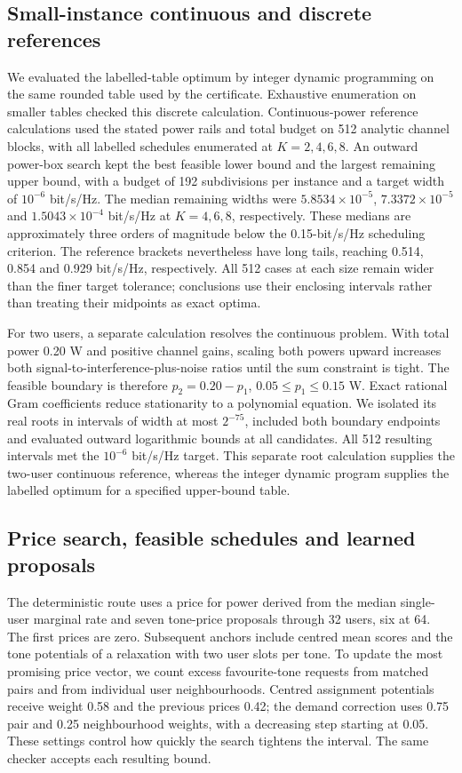 \documentclass[lineno,pdflatex,sn-nature]{sn-jnl}
\begin{document}
\subsection*{Small-instance continuous and discrete references}
We evaluated the labelled-table optimum by integer dynamic programming on the same rounded table used by the certificate. Exhaustive enumeration on smaller tables checked this discrete calculation. Continuous-power reference calculations used the stated power rails and total budget on 512 analytic channel blocks, with all labelled schedules enumerated at \(K=2,4,6,8\). An outward power-box search kept the best feasible lower bound and the largest remaining upper bound, with a budget of 192 subdivisions per instance and a target width of \(10^{-6}\) bit/s/Hz. The median remaining widths were \(5.8534\times10^{-5}\), \(7.3372\times10^{-5}\) and \(1.5043\times10^{-4}\) bit/s/Hz at \(K=4,6,8\), respectively. These medians are approximately three orders of magnitude below the 0.15-bit/s/Hz scheduling criterion. The reference brackets nevertheless have long tails, reaching 0.514, 0.854 and 0.929 bit/s/Hz, respectively. All 512 cases at each size remain wider than the finer target tolerance; conclusions use their enclosing intervals rather than treating their midpoints as exact optima.

For two users, a separate calculation resolves the continuous problem. With total power 0.20 W and positive channel gains, scaling both powers upward increases both signal-to-interference-plus-noise ratios until the sum constraint is tight. The feasible boundary is therefore \(p_2=0.20-p_1\), \(0.05\leq p_1\leq0.15\) W. Exact rational Gram coefficients reduce stationarity to a polynomial equation. We isolated its real roots in intervals of width at most \(2^{-75}\), included both boundary endpoints and evaluated outward logarithmic bounds at all candidates. All 512 resulting intervals met the \(10^{-6}\) bit/s/Hz target. This separate root calculation supplies the two-user continuous reference, whereas the integer dynamic program supplies the labelled optimum for a specified upper-bound table.

\subsection*{Price search, feasible schedules and learned proposals}
The deterministic route uses a price for power derived from the median single-user marginal rate and seven tone-price proposals through 32 users, six at 64. The first prices are zero. Subsequent anchors include centred mean scores and the tone potentials of a relaxation with two user slots per tone. To update the most promising price vector, we count excess favourite-tone requests from matched pairs and from individual user neighbourhoods. Centred assignment potentials receive weight 0.58 and the previous prices 0.42; the demand correction uses 0.75 pair and 0.25 neighbourhood weights, with a decreasing step starting at 0.05. These settings control how quickly the search tightens the interval. The same checker accepts each resulting bound.
\end{document}

